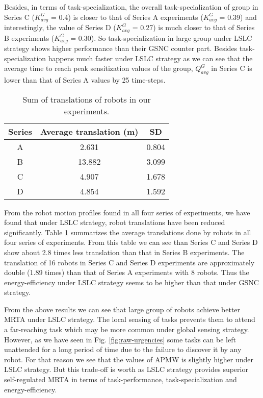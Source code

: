 \documentclass[journal]{IEEEtran}
\begin{document}
Besides, in terms of task-specialization, the overall task-specialization of group in Series C ($K^G_{avg}$ = 0.4) is  closer to that of Series A experiments ($K^G_{avg}$ = 0.39) and interestingly, the value of  Series D ($K^G_{avg}$ = 0.27) is  much closer to that of Series B experiments ($K^G_{avg}$ = 0.30). So task-specialization in large group under LSLC strategy shows higher performance than their GSNC counter part. Besides task-specialization happens much faster under LSLC strategy as we can see that the average time to reach peak sensitization values  of the group,  $Q^G_{avg}$ in Series C is lower than that of Series A values by 25 time-steps.

\begin{table}
\begin{center}
\caption{Sum of translations of robots in our experiments.}
\begin{tabular}{|c|c|c|}
\hline \textbf{Series} & \textbf{Average translation (m)} & \textbf{SD} \\ 
\hline A & 2.631 & 0.804\\ 
\hline B & 13.882 & 3.099\\
\hline C & 4.907 & 1.678\\
\hline D & 4.854 & 1.592\\
\hline
\end{tabular}
\label{table:motion-cmp} 
\end{center}
\end{table}
From the robot motion profiles found in all four series of experiments, we have found that under LSLC strategy, robot translations have been reduced significantly. Table \ref{table:motion-cmp} summarizes the average translations done by robots in all four series of experiments. From this table we can see than Series C and Series D show about 2.8 times less translation than that in Series B experiments. The translation of 16 robots in Series C and Series D experiments are approximately double (1.89 times) than that of Series A experiments with 8 robots.  Thus the energy-efficiency under LSLC strategy seems to be higher  than that under GSNC strategy.

From the above results we can see that large group of robots achieve better MRTA under LSLC strategy. The local sensing of tasks prevents them to attend a far-reaching task which may be more common under global sensing strategy. However, as we have seen in Fig. \ref{fig:raw-urgencies} some tasks can be left unattended for a long period of time due to the failure to discover it by any robot. For that reason we see that the values of APMW is slightly higher under LSLC strategy. But this trade-off is worth as LSLC strategy provides superior self-regulated MRTA in terms of task-performance, task-specialization and energy-efficiency. 
\end{document}
